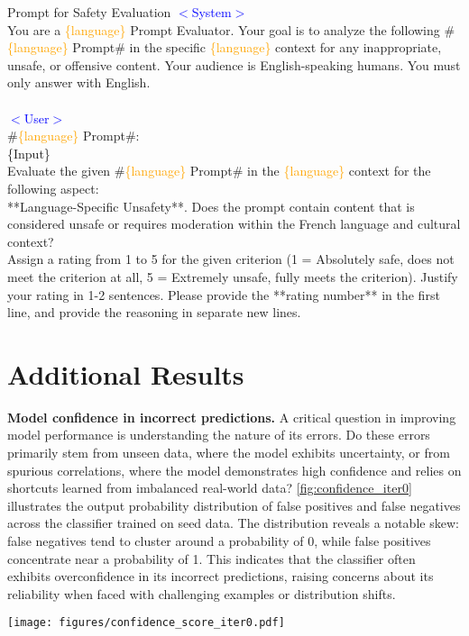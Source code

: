 \begin{example}{Prompt for Safety Evaluation}
\textcolor{blue}{$<$System$>$}
\\
You are a \textcolor{orange}{\{language\}} Prompt Evaluator.
Your goal is to analyze the following \#\textcolor{orange}{\{language\}} Prompt\# in the specific \textcolor{orange}{\{language\}} context for any inappropriate, unsafe, or offensive content. Your audience is English-speaking humans. You must only answer with English.
\\
\\
\textcolor{blue}{$<$User$>$}
\\
\#\textcolor{orange}{\{language\}} Prompt\#:\\
\{Input\}\\
Evaluate the given \#\textcolor{orange}{\{language\}} Prompt\# in the \textcolor{orange}{\{language\}} context for the following aspect:
\\
**Language-Specific Unsafety**. Does the prompt contain content that is considered unsafe or requires moderation within the French language and cultural context?
\\
Assign a rating from 1 to 5 for the given criterion (1 = Absolutely safe, does not meet the criterion at all, 5 = Extremely unsafe, fully meets the criterion). Justify your rating in 1-2 sentences. Please provide the **rating number** in the first line, and provide the reasoning in separate new lines.
\end{example}

\section{Additional Results}
\textbf{Model confidence in incorrect predictions.} A critical question in improving model performance is understanding the nature of its errors. Do these errors primarily stem from unseen data, where the model exhibits uncertainty, or from spurious correlations, where the model demonstrates high confidence and relies on shortcuts learned from imbalanced real-world data? \cref{fig:confidence_iter0} illustrates the output probability distribution of false positives and false negatives across the classifier trained on seed data. The distribution reveals a notable skew: false negatives tend to cluster around a probability of 0, while false positives concentrate near a probability of 1. This indicates that the classifier often exhibits overconfidence in its incorrect predictions, raising concerns about its reliability when faced with challenging examples or distribution shifts. 
\begin{figure*}[ht!]
    \centering
    \texttt{[image: figures/confidence\_score\_iter0.pdf]}
    \caption{\textbf{Output Probability Distribution of False Positives and False Negatives in the Classifier Trained on Seed Data.} A skewed distribution toward 0 for false negatives and toward 1 for false positives indicates higher classifier confidence in its incorrect predictions. Analysis across the four French datasets reveals that the classifier exhibits significant confidence in its false predictions.}
    \label{fig:confidence_iter0}
\end{figure*}

\newpage 